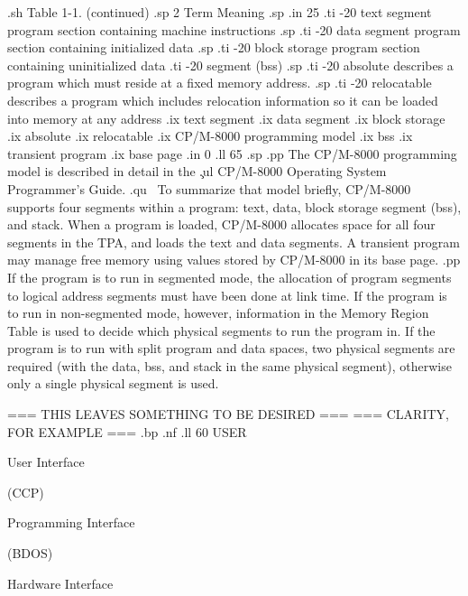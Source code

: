 .sh
Table 1-1.  (continued)
.sp 2
         Term                          Meaning
.sp
.in 25
.ti -20
text segment        program section containing machine instructions
.sp
.ti -20
data segment        program section containing initialized data
.sp
.ti -20
block storage       program section containing uninitialized data
.ti -20
segment (bss)
.sp
.ti -20
absolute            describes a program which must reside at a fixed memory 
address.
.sp
.ti -20
relocatable         describes a program which includes relocation information 
so it can be loaded into memory at any address
.ix text segment
.ix data segment
.ix block storage
.ix absolute
.ix relocatable
.ix CP/M-8000 programming model
.ix bss
.ix transient program
.ix base page 
.in 0
.ll 65
.sp
.pp
The CP/M-8000 programming model is described in detail in the \c
.ul
CP/M-8000 Operating System Programmer's Guide.
.qu
\  To summarize that model briefly, CP/M-8000 supports four segments within 
a program:  text, data, block storage segment (bss), and stack.  When a 
program is loaded, CP/M-8000 allocates space for all four segments in the TPA, 
and loads the text and data segments.  A transient program may manage free
memory using values stored by CP/M-8000 in its base page.
.pp
If the program is to run in segmented mode, 
the allocation of program segments to logical address segments must
have been done at link time.  If the program is to run in non-segmented
mode, however, information in the Memory Region Table is used to
decide which physical segments to run the program in.  If the program
is to run with split program and data spaces, two physical segments
are required (with the data, bss, and stack in the same physical
segment), otherwise only a single physical segment is used.

	=== THIS LEAVES SOMETHING TO BE DESIRED ===
	=== CLARITY, FOR EXAMPLE                ===
.bp
.nf
.ll 60
                             USER         




                       User Interface    

                            (CCP)        






                        Programming    
                        Interface      


                         (BDOS)






                         Hardware
                        Interface


